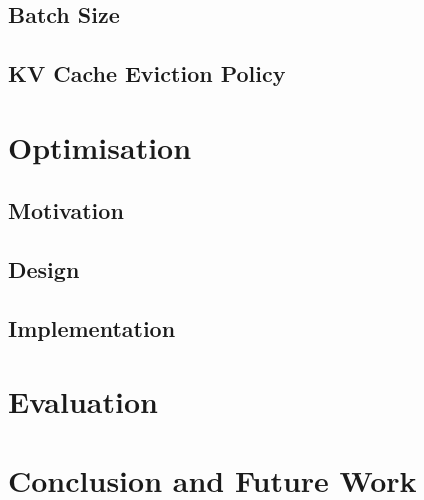 \documentclass[12pt,twoside]{report}
\begin{document}
\section{Batch Size}
\begin{comment}
  - Explain how batches in vllm are broken up vis a vis pagedattention
  - Batch size heatmap for models in isolation
\end{comment}

\section{KV Cache Eviction Policy}
\begin{comment}
  - explain vllm kv cache eviction policy
  - supporting plot
\end{comment}

\chapter{Optimisation}
\begin{comment}
  - Detail how my optimisation works and how it is implemented
\end{comment}

\section{Motivation}
\section{Design}
\section{Implementation}

\chapter{Evaluation}
\begin{comment}
  - Evaluate optimisation...
\end{comment}

\chapter{Conclusion and Future Work}
\begin{comment}
  - Keep this short and just summarise key findings and elaborate on future optimisations/research directions.
\end{comment}




\end{document}
